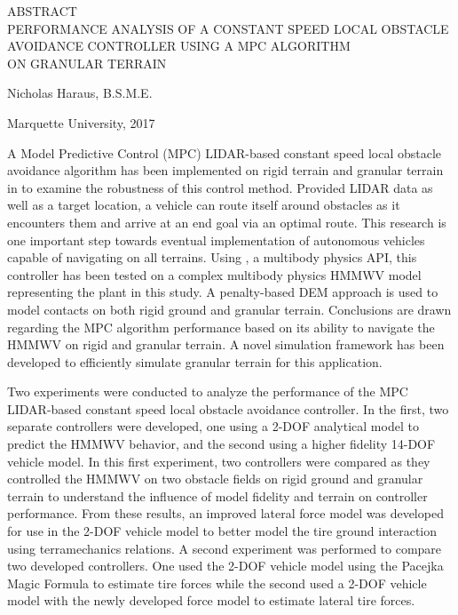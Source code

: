 \documentclass[12pt,onecolumn]{report}
\newcommand{\CHRONO}{{\sffamily{{Chrono}}}}
\begin{document}
\begin{singlespacing}
\begin{center}

ABSTRACT\\
PERFORMANCE ANALYSIS OF A CONSTANT SPEED LOCAL OBSTACLE\\ AVOIDANCE CONTROLLER USING A MPC ALGORITHM\\ ON GRANULAR TERRAIN\\

\vspace{0.2in}

Nicholas Haraus, B.S.M.E.\\
\vspace{0.1in}

Marquette University, 2017
\end{center}

\vspace{0.2in}

A Model Predictive Control (MPC) LIDAR-based constant speed local obstacle avoidance algorithm has been implemented on rigid terrain and granular terrain in {\CHRONO} to examine the robustness of this control method. Provided LIDAR data as well as a target location, a vehicle can route itself around obstacles as it encounters them and arrive at an end goal via an optimal route. This research is one important step towards eventual implementation of autonomous vehicles capable of navigating on all terrains. Using {\CHRONO}, a multibody physics API, this controller has been tested on a complex multibody physics HMMWV model representing the plant in this study. A penalty-based DEM approach is used to model contacts on both rigid ground and granular terrain. Conclusions are drawn regarding the MPC algorithm performance based on its ability to navigate the {\CHRONO} HMMWV on rigid and granular terrain. A novel simulation framework has been developed to efficiently simulate granular terrain for this application.

Two experiments were conducted to analyze the performance of the MPC LIDAR-based constant speed local obstacle avoidance controller. In the first, two separate controllers were developed, one using a 2-DOF analytical model to predict the HMMWV behavior, and the second using a higher fidelity 14-DOF vehicle model. In this first experiment, two controllers were compared as they controlled the HMMWV on two obstacle fields on rigid ground and granular terrain to understand the influence of model fidelity and terrain on controller performance. From these results, an improved lateral force model was developed for use in the 2-DOF vehicle model to better model the tire ground interaction using terramechanics relations. A second experiment was performed to compare two developed controllers. One used the 2-DOF vehicle model using the Pacejka Magic Formula to estimate tire forces while the second used a 2-DOF vehicle model with the newly developed force model to estimate lateral tire forces. 


\end{singlespacing}
\end{document}
